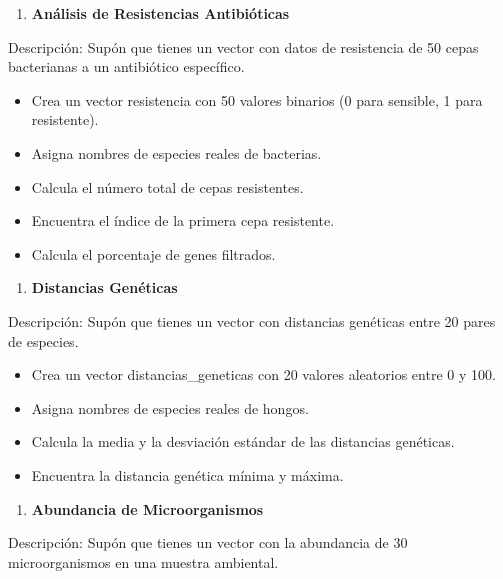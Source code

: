 \documentclass[
]{book}
\providecommand{\tightlist}{%
  \setlength{\itemsep}{0pt}\setlength{\parskip}{0pt}}
\begin{document}
\begin{enumerate}
\def\labelenumi{\arabic{enumi}.}
\setcounter{enumi}{1}
\tightlist
\item
  \textbf{Análisis de Resistencias Antibióticas}
\end{enumerate}

Descripción: Supón que tienes un vector con datos de resistencia de 50 cepas bacterianas a un antibiótico específico.

\begin{itemize}
\tightlist
\item
  Crea un vector resistencia con 50 valores binarios (0 para sensible, 1 para resistente).
\item
  Asigna nombres de especies reales de bacterias.
\item
  Calcula el número total de cepas resistentes.
\item
  Encuentra el índice de la primera cepa resistente.
\item
  Calcula el porcentaje de genes filtrados.
\end{itemize}

\begin{enumerate}
\def\labelenumi{\arabic{enumi}.}
\setcounter{enumi}{2}
\tightlist
\item
  \textbf{Distancias Genéticas}
\end{enumerate}

Descripción: Supón que tienes un vector con distancias genéticas entre 20 pares de especies.

\begin{itemize}
\tightlist
\item
  Crea un vector distancias\_geneticas con 20 valores aleatorios entre 0 y 100.
\item
  Asigna nombres de especies reales de hongos.
\item
  Calcula la media y la desviación estándar de las distancias genéticas.
\item
  Encuentra la distancia genética mínima y máxima.
\end{itemize}

\begin{enumerate}
\def\labelenumi{\arabic{enumi}.}
\setcounter{enumi}{3}
\tightlist
\item
  \textbf{Abundancia de Microorganismos}
\end{enumerate}

Descripción: Supón que tienes un vector con la abundancia de 30 microorganismos en una muestra ambiental.
\end{document}
